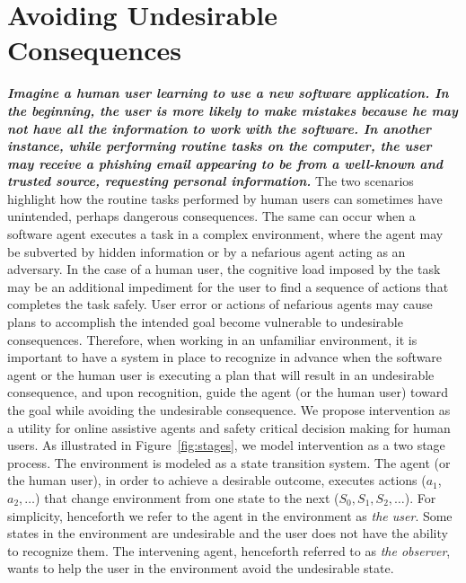 \chapter{Avoiding Undesirable Consequences}
\textit{\textbf{Imagine a human user learning to use a new software application. In the beginning, the user is more likely to make mistakes because he may not have all the information to work with the software. In another instance, while performing routine tasks on the computer, the user may receive a phishing email appearing to be from a well-known and trusted source, requesting personal information.}}
The two scenarios highlight how the routine tasks performed by human users can sometimes have unintended, perhaps dangerous consequences.
The same can occur when a software agent executes a task in a complex environment, where the agent may be subverted by hidden information or by a nefarious agent acting as an adversary. 
In the case of a human user, the cognitive load imposed by the task may be an additional impediment for the user to find a sequence of actions that completes the task safely.
User error or actions of nefarious agents may cause plans to accomplish the intended goal become vulnerable to undesirable consequences. 
Therefore, when working in an unfamiliar environment, it is important to have a system in place to recognize in advance when the software agent or the human user is executing a plan that will result in an undesirable consequence, and upon recognition, guide the agent (or the human user) toward the goal while avoiding the undesirable consequence. 
We propose intervention as a utility for online assistive agents and safety critical decision making for human users.
As illustrated in Figure~\ref{fig:stages}, we model intervention as a two stage process. 
The environment is modeled as a state transition system. 
The agent (or the human user), in order to achieve a desirable outcome, executes actions ($a_1$, $a_2, \ldots$) that change environment from one state to the next ($S_0, S_1, S_2, \ldots$). 
For simplicity, henceforth we refer to the agent in the environment as \textit{the user}.
Some states in the environment are undesirable and the user does not have the ability to recognize them. 
The intervening agent, henceforth referred to as \textit{the observer}, wants to help the user in the environment avoid the undesirable state.


